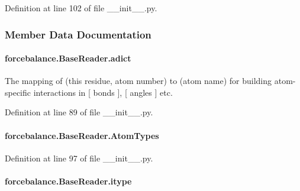 Definition at line 102 of file \-\_\-\-\_\-init\-\_\-\-\_\-.\-py.



\subsubsection{Member Data Documentation}
\hypertarget{classforcebalance_1_1BaseReader_a2c46ad6b66cf09a30e917ce4a1997e2a}{
\paragraph[{adict}]{\setlength{\rightskip}{0pt plus 5cm}forcebalance.\-Base\-Reader.\-adict\hspace{0.3cm}{\ttfamily [inherited]}}}\label{classforcebalance_1_1BaseReader_a2c46ad6b66cf09a30e917ce4a1997e2a}


The mapping of (this residue, atom number) to (atom name) for building atom-\/specific interactions in \mbox{[} bonds \mbox{]}, \mbox{[} angles \mbox{]} etc. 



Definition at line 89 of file \-\_\-\-\_\-init\-\_\-\-\_\-.\-py.

\hypertarget{classforcebalance_1_1BaseReader_a69ca7d949a4a3df4d9f61e617fe0e270}{
\paragraph[{Atom\-Types}]{\setlength{\rightskip}{0pt plus 5cm}forcebalance.\-Base\-Reader.\-Atom\-Types\hspace{0.3cm}{\ttfamily [inherited]}}}\label{classforcebalance_1_1BaseReader_a69ca7d949a4a3df4d9f61e617fe0e270}


Definition at line 97 of file \-\_\-\-\_\-init\-\_\-\-\_\-.\-py.

\hypertarget{classforcebalance_1_1BaseReader_a22ff3f4c684c728e019d801fface36f6}{
\paragraph[{itype}]{\setlength{\rightskip}{0pt plus 5cm}forcebalance.\-Base\-Reader.\-itype\hspace{0.3cm}{\ttfamily [inherited]}}}\label{classforcebalance_1_1BaseReader_a22ff3f4c684c728e019d801fface36f6}


